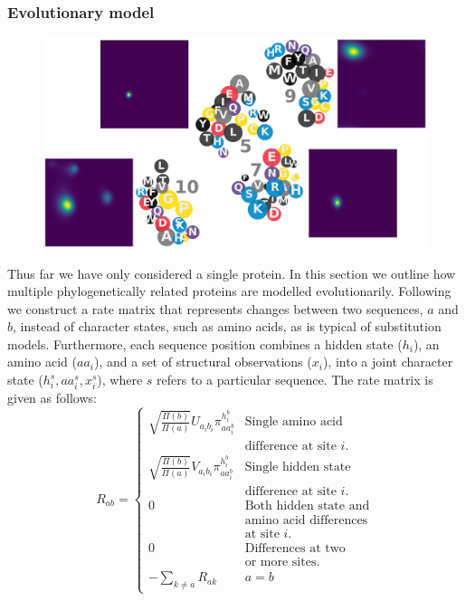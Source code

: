 \documentclass[nogrid]{MBE}%
\begin{document}
\subsubsection{Evolutionary model}
\begin{figure}
	\centering
	\includegraphics[width=2.0\columnwidth]{figures/rate-network-withstructure.pdf}
	\caption{}%
	\label{fig:ratenetwork}%
\end{figure}
Thus far we have only considered a single protein. In this section we outline how multiple phylogenetically related proteins are modelled evolutionarily. Following \citet{choi2008basing} we construct a rate matrix that represents changes between two sequences, $a$ and $b$, instead of character states, such as amino acids, as is typical of substitution models. Furthermore, each sequence position combines a hidden state ($h_i$), an amino acid ($aa_i$), and a set of structural observations ($x_i$), into a joint character state ($h^{s}_i,aa^{s}_i,x^{s}_i$), where $s$ refers to a particular sequence. The rate matrix is given as follows:
\begin{equation}
\label{eq:ratematrix}
R_{ab}=\begin{cases}

\sqrt{\frac{\Pi(b)}{\Pi(a)}}U_{a_{i}b_{i}}\pi^{h^{b}_{i}}_{aa^{b}_{i}} & \text{Single amino acid}\\
& \text{difference at site $i$.}\\ 

\sqrt{\frac{\Pi(b)}{\Pi(a)}}V_{a_{i}b_{i}}\pi^{h^{b}_{i}}_{aa^{b}_{i}} & \text{Single hidden state}\\
& \text{difference at site $i$.}\\ 

0 & \text{Both hidden state and}\\
& \text{amino acid differences}\\
& \text{at site $i$.}\\ 

0 & \text{Differences at two}\\
& \text{or more sites.}\\

-\underset{k\neq a}{\sum}R_{ak} & a=b
\end{cases}
\end{equation}
\end{document}
